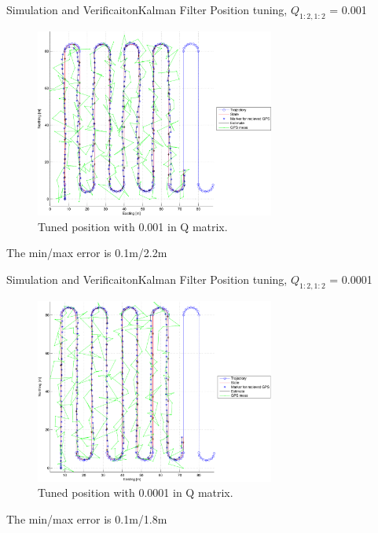 \documentclass[10pt,handout]{beamer}
\begin{document}
\begin{frame}{Simulation and Verificaiton}{Kalman Filter}
Position tuning, $Q_{1:2,1:2}$ = 0.001
  \begin{figure}
    \includegraphics[width=0.7\textwidth]{../../code/matlab/q0,001}
    \caption{\scriptsize Tuned position with 0.001 in Q matrix.}
    \label{fig:q0.001}
  \end{figure}
  The min/max error is 0.1m/2.2m
\end{frame}

\begin{frame}{Simulation and Verificaiton}{Kalman Filter}
Position tuning, $Q_{1:2,1:2}$ = 0.0001
  \begin{figure}
    \includegraphics[width=0.7\textwidth]{../../code/matlab/q0,0001}
    \caption{\scriptsize Tuned position with 0.0001 in Q matrix.}
    \label{fig:q0.0001}
  \end{figure}
  The min/max error is 0.1m/1.8m
\end{frame}
\end{document}
